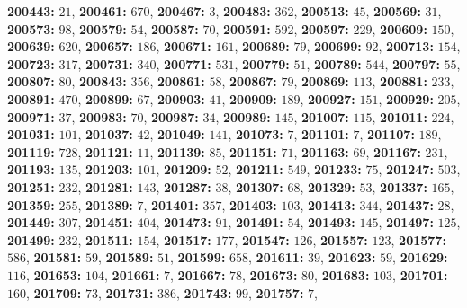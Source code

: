 \textsf{\bfseries 200443:} $21$, \textsf{\bfseries 200461:} $670$, \textsf{\bfseries 200467:} $3$, \textsf{\bfseries 200483:} $362$, \textsf{\bfseries 200513:} $45$, \textsf{\bfseries 200569:} $31$, \textsf{\bfseries 200573:} $98$, \textsf{\bfseries 200579:} $54$, \textsf{\bfseries 200587:} $70$, \textsf{\bfseries 200591:} $592$, \textsf{\bfseries 200597:} $229$, \textsf{\bfseries 200609:} $150$, \textsf{\bfseries 200639:} $620$, \textsf{\bfseries 200657:} $186$, \textsf{\bfseries 200671:} $161$, \textsf{\bfseries 200689:} $79$, \textsf{\bfseries 200699:} $92$, \textsf{\bfseries 200713:} $154$, \textsf{\bfseries 200723:} $317$, \textsf{\bfseries 200731:} $340$, \textsf{\bfseries 200771:} $531$, \textsf{\bfseries 200779:} $51$, \textsf{\bfseries 200789:} $544$, \textsf{\bfseries 200797:} $55$, \textsf{\bfseries 200807:} $80$, \textsf{\bfseries 200843:} $356$, \textsf{\bfseries 200861:} $58$, \textsf{\bfseries 200867:} $79$, \textsf{\bfseries 200869:} $113$, \textsf{\bfseries 200881:} $233$, \textsf{\bfseries 200891:} $470$, \textsf{\bfseries 200899:} $67$, \textsf{\bfseries 200903:} $41$, \textsf{\bfseries 200909:} $189$, \textsf{\bfseries 200927:} $151$, \textsf{\bfseries 200929:} $205$, \textsf{\bfseries 200971:} $37$, \textsf{\bfseries 200983:} $70$, \textsf{\bfseries 200987:} $34$, \textsf{\bfseries 200989:} $145$, \textsf{\bfseries 201007:} $115$, \textsf{\bfseries 201011:} $224$, \textsf{\bfseries 201031:} $101$, \textsf{\bfseries 201037:} $42$, \textsf{\bfseries 201049:} $141$, \textsf{\bfseries 201073:} $7$, \textsf{\bfseries 201101:} $7$, \textsf{\bfseries 201107:} $189$, \textsf{\bfseries 201119:} $728$, \textsf{\bfseries 201121:} $11$, \textsf{\bfseries 201139:} $85$, \textsf{\bfseries 201151:} $71$, \textsf{\bfseries 201163:} $69$, \textsf{\bfseries 201167:} $231$, \textsf{\bfseries 201193:} $135$, \textsf{\bfseries 201203:} $101$, \textsf{\bfseries 201209:} $52$, \textsf{\bfseries 201211:} $549$, \textsf{\bfseries 201233:} $75$, \textsf{\bfseries 201247:} $503$, \textsf{\bfseries 201251:} $232$, \textsf{\bfseries 201281:} $143$, \textsf{\bfseries 201287:} $38$, \textsf{\bfseries 201307:} $68$, \textsf{\bfseries 201329:} $53$, \textsf{\bfseries 201337:} $165$, \textsf{\bfseries 201359:} $255$, \textsf{\bfseries 201389:} $7$, \textsf{\bfseries 201401:} $357$, \textsf{\bfseries 201403:} $103$, \textsf{\bfseries 201413:} $344$, \textsf{\bfseries 201437:} $28$, \textsf{\bfseries 201449:} $307$, \textsf{\bfseries 201451:} $404$, \textsf{\bfseries 201473:} $91$, \textsf{\bfseries 201491:} $54$, \textsf{\bfseries 201493:} $145$, \textsf{\bfseries 201497:} $125$, \textsf{\bfseries 201499:} $232$, \textsf{\bfseries 201511:} $154$, \textsf{\bfseries 201517:} $177$, \textsf{\bfseries 201547:} $126$, \textsf{\bfseries 201557:} $123$, \textsf{\bfseries 201577:} $586$, \textsf{\bfseries 201581:} $59$, \textsf{\bfseries 201589:} $51$, \textsf{\bfseries 201599:} $658$, \textsf{\bfseries 201611:} $39$, \textsf{\bfseries 201623:} $59$, \textsf{\bfseries 201629:} $116$, \textsf{\bfseries 201653:} $104$, \textsf{\bfseries 201661:} $7$, \textsf{\bfseries 201667:} $78$, \textsf{\bfseries 201673:} $80$, \textsf{\bfseries 201683:} $103$, \textsf{\bfseries 201701:} $160$, \textsf{\bfseries 201709:} $73$, \textsf{\bfseries 201731:} $386$, \textsf{\bfseries 201743:} $99$, \textsf{\bfseries 201757:} $7$, 
